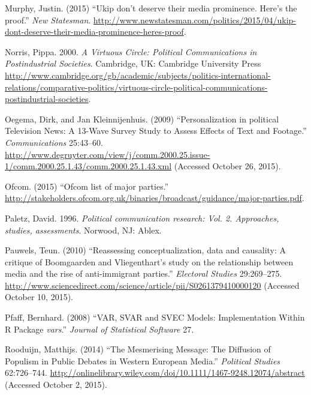 \documentclass[12pt,article]{article}
\begin{document}
Murphy, Justin. (2015) ``Ukip don't deserve their media prominence.
Here's the proof.'' \emph{New Statesman}.
\url{http://www.newstatesman.com/politics/2015/04/ukip-dont-deserve-their-media-prominence-heres-proof}.

Norris, Pippa. 2000. \emph{A Virtuous Circle: Political Communications
in Postindustrial Societies}. Cambridge, UK: Cambridge University Press
\url{http://www.cambridge.org/gb/academic/subjects/politics-international-relations/comparative-politics/virtuous-circle-political-communications-postindustrial-societies}.

Oegema, Dirk, and Jan Kleinnijenhuis. (2009) ``Personalization in
political Television News: A 13-Wave Survey Study to Assess Effects of
Text and Footage.'' \emph{Communications} 25:43--60.
\url{http://www.degruyter.com/view/j/comm.2000.25.issue-1/comm.2000.25.1.43/comm.2000.25.1.43.xml}
(Accessed October 26, 2015).

Ofcom. (2015) ``Ofcom list of major parties.''
\url{http://stakeholders.ofcom.org.uk/binaries/broadcast/guidance/major-parties.pdf}.

Paletz, David. 1996. \emph{Political communication research: Vol. 2.
Approaches, studies, assessments}. Norwood, NJ: Ablex.

Pauwels, Teun. (2010) ``Reassessing conceptualization, data and
causality: A critique of Boomgaarden and Vliegenthart's study on the
relationship between media and the rise of anti-immigrant parties.''
\emph{Electoral Studies} 29:269--275.
\url{http://www.sciencedirect.com/science/article/pii/S0261379410000120}
(Accessed October 10, 2015).

Pfaff, Bernhard. (2008) ``VAR, SVAR and SVEC Models: Implementation
Within R Package \emph{vars}.'' \emph{Journal of Statistical Software}
27.

Rooduijn, Matthijs. (2014) ``The Mesmerising Message: The Diffusion of
Populism in Public Debates in Western European Media.'' \emph{Political
Studies} 62:726--744.
\url{http://onlinelibrary.wiley.com/doi/10.1111/1467-9248.12074/abstract}
(Accessed October 2, 2015).
\end{document}
